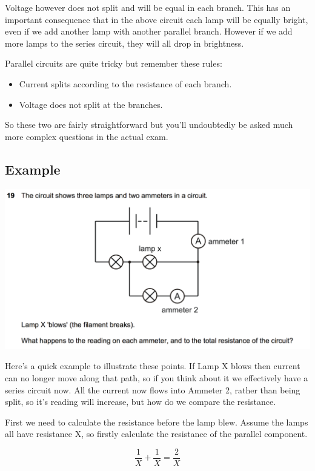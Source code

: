 \documentclass[11pt, titlepage]{article}
\begin{document}
Voltage however does not split and will be equal in each branch.  This has an important consequence that in the above circuit each lamp will be equally bright, even if we add another lamp with another parallel branch.  However if we add more lamps to the series circuit, they will all drop in brightness.

Parallel circuits are quite tricky but remember these rules:
\begin{itemize}
\item Current splits according to the resistance of each branch.
\item Voltage does not split at the branches.
\end{itemize}

So these two are fairly straightforward but you'll undoubtedly be asked much more complex questions in the actual exam.

\subsection*{Example}
\includegraphics[width=\textwidth]{2012q19}

Here's a quick example to illustrate these points.  If Lamp X blows then current can no longer move along that path, so if you think about it we effectively have a series circuit now.  All the current now flows into Ammeter 2, rather than being split, so it's reading will increase, but how do we compare the resistance.  

First we need to calculate the resistance before the lamp blew.  Assume the lamps all have resistance X, so firstly calculate the resistance of the parallel component.

\begin{equation*}
\frac{1}{X} + \frac{1}{X} = \frac{2}{X}
\end{equation*}
\end{document}
